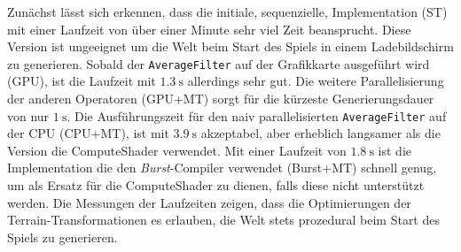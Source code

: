 Zunächst lässt sich erkennen, dass die initiale, sequenzielle, Implementation (ST) mit einer Laufzeit von über einer Minute sehr viel Zeit beansprucht.
Diese Version ist ungeeignet um die Welt beim Start des Spiels in einem Ladebildschirm zu generieren.
Sobald der \texttt{AverageFilter} auf der Grafikkarte ausgeführt wird (GPU), ist die Laufzeit mit $\SI{1.3}{\second}$ allerdings sehr gut.
Die weitere Parallelisierung der anderen Operatoren (GPU+MT) sorgt für die kürzeste Generierungsdauer von nur $\SI{1}{\second}$.
Die Ausführungszeit für den naiv parallelisierten \texttt{AverageFilter} auf der CPU (CPU+MT), ist mit $\SI{3.9}{\second}$ akzeptabel, aber erheblich langsamer als die Version die ComputeShader verwendet.
Mit einer Laufzeit von $\SI{1.8}{\second}$ ist die Implementation die den \textit{Burst}-Compiler verwendet (Burst+MT) schnell genug, um als Ersatz für die ComputeShader zu dienen, falls diese nicht unterstützt werden.
Die Messungen der Laufzeiten zeigen, dass die Optimierungen der Terrain-Transformationen es erlauben, die Welt stets prozedural beim Start des Spiels zu generieren.

